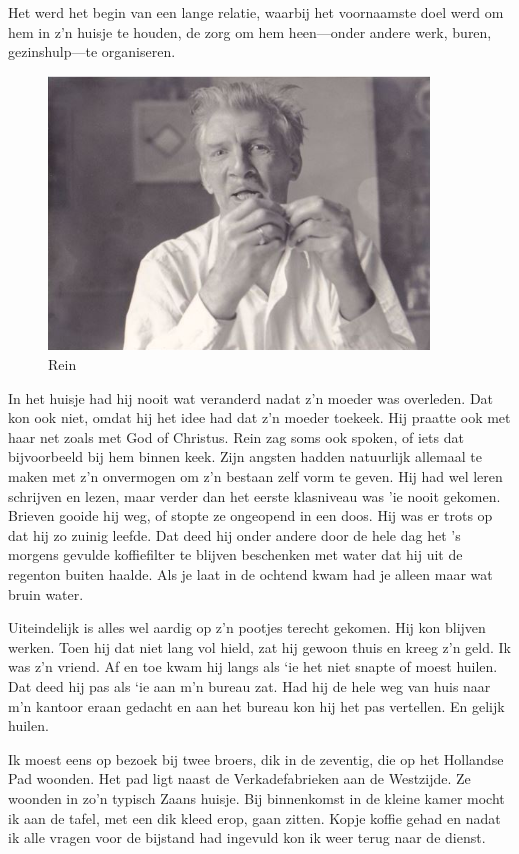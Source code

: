 \documentclass[12pt,twoside, openright]{memoir}
\begin{document}
Het werd het begin van een lange relatie, waarbij het voornaamste doel werd om hem in z’n huisje te houden, de zorg om hem heen---onder andere werk, buren, gezinshulp---te organiseren. 

\begin{figure}
\centering
\includegraphics[width=0.9\textwidth]{img/259ReinRus.JPG}
\caption*{\footnotesize Rein}
\end{figure}

In het huisje had hij nooit wat veranderd nadat z’n moeder was overleden. Dat kon ook niet, omdat hij het idee had dat z’n moeder toekeek. Hij praatte ook met haar net zoals met God of Christus. Rein zag soms ook spoken, of iets dat bijvoorbeeld bij hem binnen keek. Zijn angsten hadden natuurlijk allemaal te maken met z’n onvermogen om z’n bestaan zelf vorm te geven. Hij had wel leren schrijven en lezen, maar verder dan het eerste klasniveau was 'ie nooit gekomen. Brieven gooide hij weg, of stopte ze ongeopend in een doos. Hij was er trots op dat hij zo zuinig leefde. Dat deed hij onder andere door de hele dag het ’s morgens gevulde koffiefilter te blijven beschenken met water dat hij uit de regenton buiten haalde. Als je laat in de ochtend kwam had je alleen maar wat bruin water. 

Uiteindelijk is alles wel aardig op z’n pootjes terecht gekomen. Hij kon blijven werken. Toen hij dat niet lang vol hield, zat hij gewoon thuis en kreeg z’n geld. Ik was z’n vriend. Af en toe kwam hij langs als `ie het niet snapte of moest huilen. Dat deed hij pas als `ie aan m’n bureau zat. Had hij de hele weg van huis naar m’n kantoor eraan gedacht en aan het bureau kon hij het pas vertellen. En gelijk huilen.

Ik moest eens op bezoek bij twee broers, dik in de zeventig, die op het Hollandse Pad woonden. Het pad ligt naast de Verkadefabrieken aan de Westzijde. Ze woonden in zo’n typisch Zaans huisje. Bij binnenkomst in de kleine kamer mocht ik aan de tafel, met een dik kleed erop, gaan zitten. Kopje koffie gehad en nadat ik alle vragen voor de bijstand had ingevuld kon ik weer terug naar de dienst. 
\end{document}
